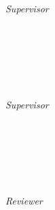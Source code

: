\begin{titlepage}
	\vfill
	\begin{minipage}[t]{.27\textwidth}
		\raggedleft
		\textit{Supervisor}
	\end{minipage}
	\hspace*{15pt}
	\begin{minipage}[t]{.65\textwidth}
		{\Large \thesisFirstSupervisor} \\
		{\small \thesisFirstSupervisorGroup} \\[-1mm]
	  	{\small \thesisFirstSupervisorDepartment} \\[-1mm]
		{\small \thesisFirstSupervisorUniversity}
	\end{minipage} \\[5mm]
	\begin{minipage}[t]{.27\textwidth}
		\raggedleft
		\textit{Supervisor}
	\end{minipage}
	\hspace*{15pt}
	\begin{minipage}[t]{.65\textwidth}
		{\Large \thesisSecondSupervisor} \\
		{\small \thesisSecondSupervisorGroup} \\[-1mm]
	  	{\small \thesisSecondSupervisorDepartment} \\[-1mm]
		{\small \thesisSecondSupervisorUniversity}
	\end{minipage} \\[5mm]
		\begin{minipage}[t]{.27\textwidth}
		\raggedleft
		\textit{Reviewer}
	\end{minipage}
	\hspace*{15pt}
	\begin{minipage}[t]{.65\textwidth}
		{\Large \thesisFirstReviewer} \\
		{\small \thesisFirstReviewerGroup} \\[-1mm]
	  	{\small \thesisFirstReviewerDepartment} \\[-1mm]
		{\small \thesisFirstReviewerUniversity}
	\end{minipage} \\[10mm]

	\thesisDate \\

\end{titlepage}


